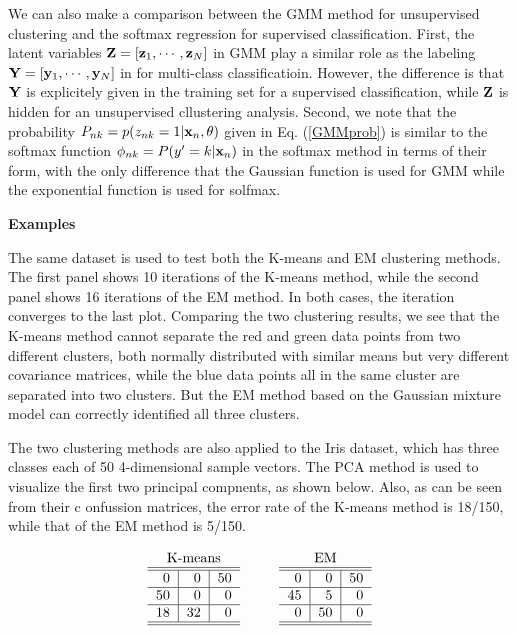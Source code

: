 \documentclass{article}
\begin{document}
We can also make a comparison between the GMM method for 
unsupervised clustering and the softmax regression for 
supervised classification. First, the latent variables 
${\bf Z}=[{\bf z}_1,\cdots,{\bf z}_N]$ in GMM play a similar 
role as the labeling ${\bf Y}=[{\bf y}_1,\cdots,{\bf y}_N]$ in 
 for
multi-class classificatioin. However, the difference is that 
${\bf Y}$ is explicitely given in the training set for a supervised 
classification, while ${\bf Z}$ is hidden for an unsupervised 
cllustering analysis. Second, we note that the probability 
$P_{nk}=p(z_{nk}=1|{\bf x}_n,\theta)$ given in Eq. (\ref{GMMprob}) 
is similar to the softmax function $\phi_{nk}=P(y'=k|{\bf x}_n)$ 
in the softmax method in terms of their form, with the only 
difference that the Gaussian function is used for GMM while the
exponential function is used for solfmax.

{\bf Examples} 

The same dataset is used to test both the K-means and EM clustering 
methods. The first panel shows 10 iterations of the K-means method,
while the second panel shows 16 iterations of the EM method. In both
cases, the iteration converges to the last plot. Comparing the two 
clustering results, we see that the K-means method cannot separate 
the red and green data points from two different clusters, both normally 
distributed with similar means but very different covariance matrices, 
while the blue data points all in the same cluster are separated into 
two clusters. But the EM method based on the Gaussian mixture model 
can correctly identified all three clusters.


The two clustering methods are also applied to the Iris dataset,
which has three classes each of 50 4-dimensional sample vectors.
The PCA method is used to visualize the first two principal 
compnents, as shown below. Also, as can be seen from their c
onfussion matrices, the error rate of the K-means method is 18/150,
while that of the EM method is 5/150.

\begin{equation}
\begin{tabular}{r|r|r}
\multicolumn{3}{c}{K-means}\\\hline\hline 
0 & 0 & 50\\\hline 50 & 0 & 0\\\hline18 & 32 & 0\\\hline\hline
  \end{tabular}
\;\;\;\;\;\;\;\;\;\;
\begin{tabular}{r|r|r}
\multicolumn{3}{c}{EM}\\\hline\hline
0 & 0 & 50\\\hline45 & 5 & 0\\\hline0 & 50 & 0\\\hline\hline
\end{tabular}
\end{equation}
\end{document}
